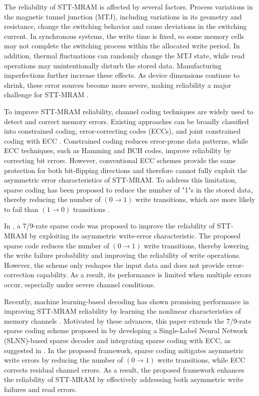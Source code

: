 \documentclass[conference]{IEEEtran}
\begin{document}
The reliability of STT-MRAM is affected by several factors. Process variations in the magnetic tunnel junction (MTJ), including variations in its geometry and resistance, change the switching behavior and cause deviations in the switching current. In synchronous systems, the write time is fixed, so some memory cells may not complete the switching process within the allocated write period. In addition, thermal fluctuations can randomly change the MTJ state, while read operations may unintentionally disturb the stored data. Manufacturing imperfections further increase these effects. As device dimensions continue to shrink, these error sources become more severe, making reliability a major challenge for STT-MRAM \cite{wu2020survey}.


To improve STT-MRAM reliability, channel coding techniques are widely used to detect and correct memory errors. Existing approaches can be broadly classified into constrained coding, error-correcting codes (ECCs), and joint constrained coding with ECC \cite{nguyen2026error}. Constrained coding reduces error-prone data patterns, while ECC techniques, such as Hamming and BCH codes, improve reliability by correcting bit errors. However, conventional ECC schemes provide the same protection for both bit-flipping directions and therefore cannot fully exploit the asymmetric error characteristics of STT-MRAM. To address this limitation, sparse coding has been proposed to reduce the number of "1"s in the stored data, thereby reducing the number of $(0 \rightarrow 1)$ write transitions, which are more likely to fail than $(1 \rightarrow 0)$ transitions \cite{nguyen2021design}.

In \cite{nguyen2021design}, a 7/9-rate sparse code was proposed to improve the reliability of STT-MRAM by exploiting its asymmetric write-error characteristic. The proposed sparse code reduces the number of $(0 \rightarrow 1)$ write transitions, thereby lowering the write failure probability and improving the reliability of write operations. However, the scheme only reshapes the input data and does not provide error-correction capability. As a result, its performance is limited when multiple errors occur, especially under severe channel conditions.

Recently, machine learning-based decoding has shown promising performance in improving STT-MRAM reliability by learning the nonlinear characteristics of memory channels \cite{gruber2017deep}. Motivated by these advances, this paper extends the 7/9-rate sparse coding scheme proposed in \cite{nguyen2021design} by developing a Single-Label Neural Network (SLNN)-based sparse decoder and integrating sparse coding with ECC, as suggested in \cite{nguyen2026error}. In the proposed framework, sparse coding mitigates asymmetric write errors by reducing the number of $(0 \rightarrow 1)$ write transitions, while ECC corrects residual channel errors. As a result, the proposed framework enhances the reliability of STT-MRAM by effectively addressing both asymmetric write failures and read errors.
\end{document}
